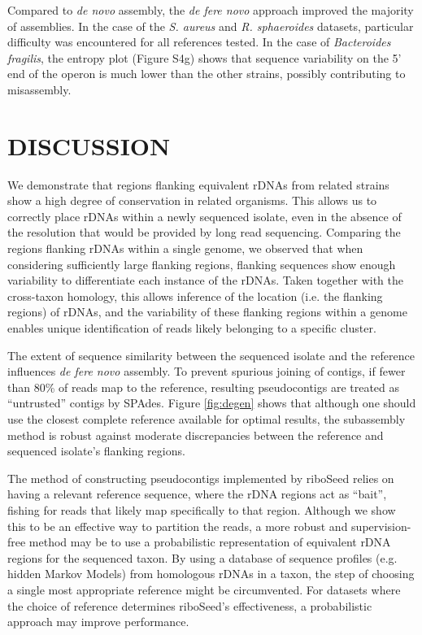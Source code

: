 \documentclass[a4,center,fleqn]{NAR}
\begin{document}
Compared to \textit{de novo} assembly, the \textit{de fere novo} approach improved the majority of assemblies. In the case of the \textit{S. aureus} and \textit{R. sphaeroides} datasets, particular difficulty was encountered for all references tested. In the case of \textit{Bacteroides fragilis}, the entropy plot (Figure S4g) shows that sequence variability on the 5' end of the operon is much lower than the other strains, possibly contributing to misassembly.

\section*{DISCUSSION}
We demonstrate that regions flanking equivalent rDNAs from related strains show a high degree of conservation in related organisms. This allows us to correctly place rDNAs within a newly sequenced isolate, even in the absence of the resolution that would be provided by long read sequencing. Comparing the regions flanking rDNAs within a single genome, we observed that when considering sufficiently large flanking regions, flanking sequences show enough variability to differentiate each instance of the rDNAs. Taken together with the cross-taxon homology, this allows inference of the location (i.e. the flanking regions) of rDNAs, and the variability of these flanking regions within a genome enables unique identification of reads likely belonging to a specific cluster.

The extent of sequence similarity between the sequenced isolate and the reference influences \textit{de fere novo} assembly. To prevent spurious joining of contigs, if fewer than 80\% of reads map to the reference, resulting pseudocontigs are treated as ``untrusted'' contigs by SPAdes. Figure \ref{fig:degen} shows that although one should use the closest complete reference available for optimal results, the subassembly method is robust against moderate discrepancies between the reference and sequenced isolate's flanking regions.

The method of constructing pseudocontigs implemented by riboSeed relies on having a relevant reference sequence, where the rDNA regions act as ``bait'', fishing for reads that likely map specifically to that region. Although we show this to be an effective way to partition the reads, a more robust and supervision-free method may be to use a probabilistic representation of equivalent rDNA regions for the sequenced taxon. By using a database of sequence profiles (e.g. hidden Markov Models) from homologous rDNAs in a taxon, the step of choosing a single most appropriate reference might be circumvented. For datasets where the choice of reference determines riboSeed's effectiveness, a probabilistic approach may improve performance.
\end{document}
